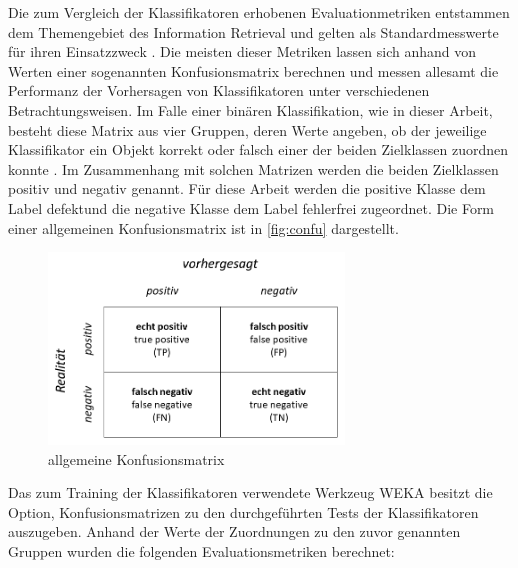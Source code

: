 Die zum Vergleich der Klassifikatoren erhobenen Evaluationmetriken entstammen dem Themengebiet des Information Retrieval und gelten als Standardmesswerte für ihren Einsatzzweck \cite{Sammut2017}. Die meisten dieser Metriken lassen sich anhand von Werten einer sogenannten Konfusionsmatrix berechnen und messen allesamt die Performanz der Vorhersagen von Klassifikatoren unter verschiedenen Betrachtungsweisen. Im Falle einer binären Klassifikation, wie in dieser Arbeit, besteht diese Matrix aus vier Gruppen, deren Werte angeben, ob der jeweilige Klassifikator ein Objekt korrekt oder falsch einer der beiden Zielklassen zuordnen konnte \cite{Sammut2017}. Im Zusammenhang mit solchen Matrizen werden die beiden Zielklassen \glqq positiv\grqq{} und \glqq negativ\grqq{} genannt. Für diese Arbeit werden die positive Klasse dem Label \glqq defekt\grqq und die negative Klasse dem Label \glqq fehlerfrei\grqq{} zugeordnet. Die Form einer allgemeinen Konfusionsmatrix ist in \autoref{fig:confu} dargestellt.

\begin{figure}[H]
    \centering
    \includegraphics[width=0.7\textwidth]{images/Confusion}
    \caption{allgemeine Konfusionsmatrix\label{fig:confu}}
\end{figure}

Das zum Training der Klassifikatoren verwendete Werkzeug WEKA besitzt die Option, Konfusionsmatrizen zu den durchgeführten Tests der Klassifikatoren auszugeben. Anhand der Werte der Zuordnungen zu den zuvor genannten Gruppen wurden die folgenden Evaluationsmetriken berechnet: 

